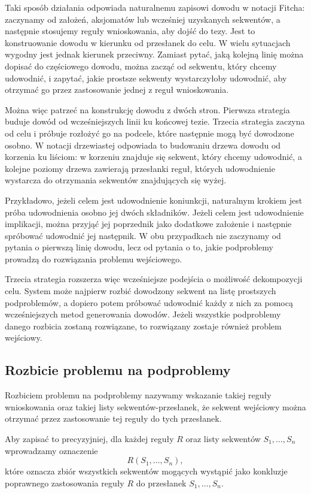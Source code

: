 \documentclass[shortabstract]{iithesis}
\theoremstyle{definition}
\theoremstyle{remark}
\theoremstyle{plain}
\begin{document}
Taki sposób działania odpowiada naturalnemu zapisowi dowodu w notacji Fitcha:
zaczynamy od założeń, aksjomatów lub wcześniej uzyskanych sekwentów, a następnie
stosujemy reguły wnioskowania, aby dojść do tezy. Jest to konstruowanie dowodu
w kierunku od przesłanek do celu. W wielu sytuacjach wygodny jest jednak kierunek
przeciwny. Zamiast pytać, jaką kolejną linię można dopisać do częściowego dowodu,
można zacząć od sekwentu, który chcemy udowodnić, i zapytać, jakie prostsze
sekwenty wystarczyłoby udowodnić, aby otrzymać go przez zastosowanie jednej
z reguł wnioskowania.

Można więc patrzeć na konstrukcję dowodu z dwóch stron. Pierwsza strategia buduje
dowód od wcześniejszych linii ku końcowej tezie. Trzecia strategia zaczyna od celu
i próbuje rozłożyć go na podcele, które następnie mogą być dowodzone osobno.
W notacji drzewiastej odpowiada to budowaniu drzewa dowodu od korzenia ku
liściom: w korzeniu znajduje się sekwent, który chcemy udowodnić, a kolejne poziomy
drzewa zawierają przesłanki reguł, których udowodnienie wystarcza do otrzymania
sekwentów znajdujących się wyżej.

Przykładowo, jeżeli celem jest udowodnienie koniunkcji, naturalnym krokiem jest
próba udowodnienia osobno jej dwóch składników. Jeżeli celem jest udowodnienie
implikacji, można przyjąć jej poprzednik jako dodatkowe założenie i następnie
spróbować udowodnić jej następnik. W obu przypadkach nie zaczynamy od pytania
o pierwszą linię dowodu, lecz od pytania o to, jakie podproblemy prowadzą do
rozwiązania problemu wejściowego.

Trzecia strategia rozszerza więc wcześniejsze podejścia o możliwość dekompozycji
celu. System może najpierw rozbić dowodzony sekwent na listę prostszych
podproblemów, a dopiero potem próbować udowodnić każdy z nich za pomocą
wcześniejszych metod generowania dowodów. Jeżeli wszystkie podproblemy danego
rozbicia zostaną rozwiązane, to rozwiązany zostaje również problem wejściowy.

\subsection{Rozbicie problemu na podproblemy}

Rozbiciem problemu na podproblemy nazywamy wskazanie takiej reguły
wnioskowania oraz takiej listy sekwentów-przesłanek, że sekwent wejściowy
można otrzymać przez zastosowanie tej reguły do tych przesłanek.

Aby zapisać to precyzyjniej, dla każdej reguły \(R\) oraz listy sekwentów
\(S_1,\ldots,S_n\) wprowadzamy oznaczenie
\[
R(S_1,\ldots,S_n),
\]
które oznacza zbiór wszystkich sekwentów mogących wystąpić jako konkluzje
poprawnego zastosowania reguły \(R\) do przesłanek \(S_1,\ldots,S_n\).
\end{document}
